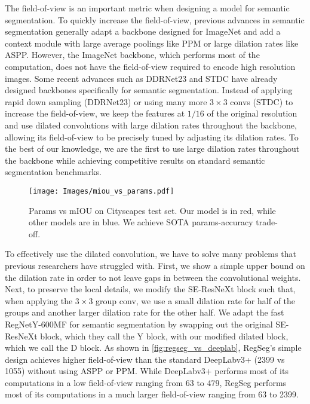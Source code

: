 \documentclass[10pt,twocolumn,letterpaper]{article}
\begin{document}
The field-of-view is an important metric when designing a model for semantic segmentation. To quickly increase the field-of-view, previous advances in semantic segmentation generally adapt a backbone designed for ImageNet\cite{deng2009imagenet} and add a context module with large average poolings like PPM\cite{pspnet} or large dilation rates like ASPP\cite{deeplabv3}. However, the ImageNet backbone, which performs most of the computation, does not have the field-of-view required to encode high resolution images. Some recent advances such as DDRNet23\cite{ddrnet} and STDC\cite{stdc} have already designed backbones specifically for semantic segmentation. Instead of applying rapid down sampling (DDRNet23) or using many more $3\times 3$ convs (STDC) to increase the field-of-view, we keep the features at $1/16$ of the original resolution and use dilated convolutions with large dilation rates throughout the backbone, allowing its field-of-view to be precisely tuned by adjusting its dilation rates. To the best of our knowledge, we are the first to use large dilation rates throughout the backbone while achieving competitive results on standard semantic segmentation benchmarks. 

\begin{figure}
  \centering
    \texttt{[image: Images/miou\_vs\_params.pdf]}

   \caption{Params vs mIOU on Cityscapes test set. Our model is in red, while other models are in blue. We achieve SOTA params-accuracy trade-off.}
   \label{fig:miouVsParams}
\end{figure}



To effectively use the dilated convolution, we have to solve many problems that previous researchers have struggled with. First, we show a simple upper bound on the dilation rate in order to not leave gaps in between the convolutional weights. Next, to preserve the local details, we modify the SE-ResNeXt\cite{hu2018squeeze,resnext} block such that, when applying the $3\times 3$ group conv, we use a small dilation rate for half of the groups and another larger dilation rate for the other half. We adapt the fast RegNetY-600MF\cite{regnet,regnetz} for semantic segmentation by swapping out the original SE-ResNeXt block, which they call the Y block, with our modified dilated block, which we call the D block. As shown in \cref{fig:regseg_vs_deeplab}, RegSeg's simple design achieves higher field-of-view than the standard DeepLabv3+ (2399 vs 1055) without using ASPP or PPM. While DeepLabv3+ performs most of its computations in a low field-of-view ranging from 63 to 479, RegSeg performs most of its computations in a much larger field-of-view ranging from 63 to 2399.
\end{document}
